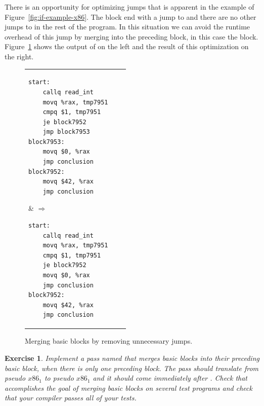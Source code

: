 \documentclass[11pt]{book}
\newtheorem{exercise}[theorem]{Exercise}
\begin{document}


There is an opportunity for optimizing jumps that is apparent in the
example of Figure~\ref{fig:if-example-x86}. The  block end
with a jump to  and there are no other jumps to
 in the rest of the program. In this situation we can
avoid the runtime overhead of this jump by merging 
into the preceding block, in this case the  block.
Figure~\ref{fig:remove-jumps} shows the output of
 on the left and the result of this
optimization on the right.

\begin{figure}[tbp]
\begin{tabular}{lll}
\begin{minipage}{0.5\textwidth}
\begin{lstlisting}
start:
    callq read_int
    movq %rax, tmp7951
    cmpq $1, tmp7951
    je block7952
    jmp block7953
block7953:
    movq $0, %rax
    jmp conclusion
block7952:
    movq $42, %rax
    jmp conclusion
\end{lstlisting}
\end{minipage}
&
$\Rightarrow\qquad$
\begin{minipage}{0.4\textwidth}
\begin{lstlisting}
start:
    callq read_int
    movq %rax, tmp7951
    cmpq $1, tmp7951
    je block7952
    movq $0, %rax
    jmp conclusion
block7952:
    movq $42, %rax
    jmp conclusion
\end{lstlisting}
\end{minipage}
\end{tabular}
\caption{Merging basic blocks by removing unnecessary jumps.}
\label{fig:remove-jumps}
\end{figure}

\begin{exercise}\normalfont
  Implement a pass named  that merges basic blocks
  into their preceding basic block, when there is only one preceding
  block. The pass should translate from pseudo $x86_1$ to pseudo
  $x86_1$ and it should come immediately after
  .  Check that 
  accomplishes the goal of merging basic blocks on several test
  programs and check that your compiler passes all of your tests.
\end{exercise}
\end{document}
